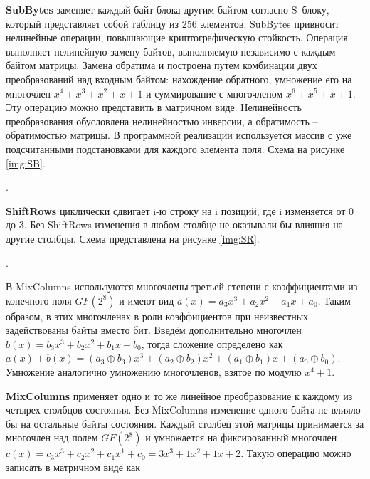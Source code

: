 \FloatBarrier

\textbf{SubBytes} заменяет каждый байт блока другим байтом согласно S--блоку, который представляет собой таблицу из 256 элементов. SubBytes привносит нелинейные операции, повышающие криптографическую стойкость. Операция выполняет нелинейную замену байтов, выполняемую независимо с каждым байтом матрицы. Замена обратима и
построена путем комбинации двух преобразований над входным байтом: нахождение обратного, умножение его на многочлен $x^4 + x^3 + x^2 + x + 1$ и суммирование с многочленом $x^6 + x^5 + x + 1$. Эту операцию можно представить в матричном виде. Нелинейность преобразования обусловлена нелинейностью инверсии, а обратимость -- обратимостью матрицы. В программной реализации используется массив с уже подсчитанными подстановками для каждого элемента поля. Схема на рисунке \ref{img:SB}.

.
\FloatBarrier

\textbf{ShiftRows} циклически сдвигает i-ю строку на i позиций, где i изменяется от 0 до 3. Без ShiftRows изменения в любом столбце не оказывали бы влияния на другие столбцы. Схема представлена на рисунке \ref{img:SR}.

.
\FloatBarrier

В MixColumns используются многочлены третьей степени с коэффициентами из конечного поля $GF(2^8)$ и имеют вид $a(x) = a_3x^3 + a_2x^2 + a_1x + a_0$. Таким образом, в этих многочленах в роли коэффициентов при неизвестных задействованы байты вместо бит. Введём дополнительно многочлен $b(x) = b_3x^3 + b_2x^2 + b_1x + b_0$, тогда сложение определено как $a(x) + b(x) = (a_3 \oplus b_3)x^3 + (a_2 \oplus b_2)x^2 + (a_1 \oplus b_1)x + (a_0 \oplus b_0)$. Умножение аналогично умножению многочленов, взятое по модулю $x^4 + 1$. 

\textbf{MixColumns} применяет одно и то же линейное преобразование к каждому из четырех столбцов состояния. Без MixColumns изменение одного байта не влияло бы на остальные байты состояния. Каждый столбец этой матрицы принимается за многочлен над полем $GF(2^8)$ и умножается на фиксированный многочлен $c(x) = c_3x^3 + c_2x^2 + c_1x^1 + c_0 = 3x^3 + 1x^2 + 1x + 2$. Такую операцию можно записать в матричном виде как

